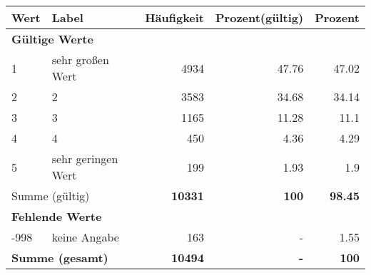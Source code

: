      \begin{longtable}{lXrrr}
     \toprule
     \textbf{Wert} & \textbf{Label} & \textbf{Häufigkeit} & \textbf{Prozent(gültig)} & \textbf{Prozent} \\
     \endhead
     \midrule
     \multicolumn{5}{l}{\textbf{Gültige Werte}}\\

     1 &
     \multicolumn{1}{X}{ sehr großen Wert   } &


       \num{4934} &
       \num[round-mode=places,round-precision=2]{47.76} &
         \num[round-mode=places,round-precision=2]{47.02} \\

     2 &
     \multicolumn{1}{X}{ 2   } &


       \num{3583} &
       \num[round-mode=places,round-precision=2]{34.68} &
         \num[round-mode=places,round-precision=2]{34.14} \\

     3 &
     \multicolumn{1}{X}{ 3   } &


       \num{1165} &
       \num[round-mode=places,round-precision=2]{11.28} &
         \num[round-mode=places,round-precision=2]{11.1} \\

     4 &
     \multicolumn{1}{X}{ 4   } &


       \num{450} &
       \num[round-mode=places,round-precision=2]{4.36} &
         \num[round-mode=places,round-precision=2]{4.29} \\

     5 &
     \multicolumn{1}{X}{ sehr geringen Wert   } &


       \num{199} &
       \num[round-mode=places,round-precision=2]{1.93} &
         \num[round-mode=places,round-precision=2]{1.9} \\
     \midrule
     \multicolumn{2}{l}{Summe (gültig)} &
       \textbf{\num{10331}} &
     \textbf{\num{100}} &
       \textbf{\num[round-mode=places,round-precision=2]{98.45}} \\
     \multicolumn{5}{l}{\textbf{Fehlende Werte}}\\
       -998 &
       keine Angabe &
         \num{163} &
        - &
         \num[round-mode=places,round-precision=2]{1.55} \\
     \midrule
     \multicolumn{2}{l}{\textbf{Summe (gesamt)}} &
          \textbf{\num{10494}} &
        \textbf{-} &
        \textbf{\num{100}} \\
     \bottomrule
     \end{longtable}
     
